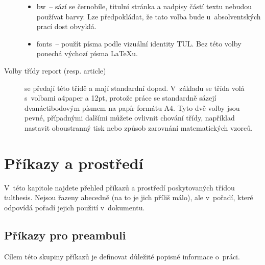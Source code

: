 \documentclass[FM,SP]{tulthesis}
\newcommand{\argument}[1]{{\ttfamily\color{\tulcolor}#1}}
\newcommand{\argumentindex}[1]{\argument{#1}\index{#1}}
\begin{document}
\begin{description}
\begin{itemize}
\item \argumentindex{bw}~-- sází se černobíle, titulní stránka a nadpisy částí
textu nebudou používat barvy. Lze předpokládat, že tato volba bude
u~absolventských prací dost obvyklá.

\item \argumentindex{fonts}~-- použít písma podle vizuální identity TUL. Bez
této volby ponechá výchozí písma \LaTeX u.
\end{itemize}

\item[Volby třídy \argument{report} (resp. \argument{article})] se předají této
třídě a mají standardní dopad. V~základu se třída volá s~volbami
\argument{a4paper} a \argument{12pt}, protože práce se standardně sázejí
dvanáctibodovým písmem na papír formátu A4. Tyto dvě volby jsou pevné,
případnými dalšími můžete ovlivnit chování třídy, například nastavit
oboustranný tisk nebo způsob zarovnání matematických vzorců.

\end{description}


\chapter{Příkazy a prostředí}

V~této kapitole najdete přehled příkazů a prostředí poskytovaných třídou
\argument{tulthesis}. Nejsou řazeny abecedně (na to je jich příliš málo), ale
v~pořadí, které odpovídá pořadí jejich použití v~dokumentu.


\section{Příkazy pro preambuli}\label{deklarace}

Cílem této skupiny příkazů je definovat důležité popisné informace o~práci.
\end{document}
